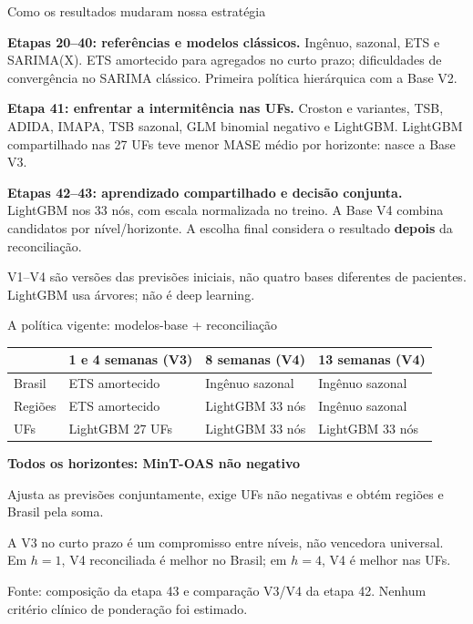 \documentclass[10pt,aspectratio=169]{beamer}
\newcommand{\nota}[1]{{\color{pucgray}\scriptsize #1}}
\begin{document}
\begin{frame}{Como os resultados mudaram nossa estratégia}
  \footnotesize
  \begin{cartao}\textbf{Etapas 20--40: referências e modelos clássicos.}
  Ingênuo, sazonal, ETS e SARIMA(X). ETS amortecido para agregados no curto prazo; dificuldades de convergência no SARIMA clássico. Primeira política hierárquica com a Base V2.\end{cartao}
  \begin{cartao}\textbf{Etapa 41: enfrentar a intermitência nas UFs.}
  Croston e variantes, TSB, ADIDA, IMAPA, TSB sazonal, GLM binomial negativo e LightGBM. LightGBM compartilhado nas 27 UFs teve menor MASE médio por horizonte: nasce a Base V3.\end{cartao}
  \begin{cartao}\textbf{Etapas 42--43: aprendizado compartilhado e decisão conjunta.}
  LightGBM nos 33 nós, com escala normalizada no treino. A Base V4 combina candidatos por nível/horizonte. A escolha final considera o resultado \textbf{depois} da reconciliação.\end{cartao}
  \nota{V1--V4 são versões das previsões iniciais, não quatro bases diferentes de pacientes. LightGBM usa árvores; não é deep learning.}
\end{frame}

\begin{frame}{A política vigente: modelos-base + reconciliação}
  \small\centering
  \renewcommand{\arraystretch}{1.5}
  \begin{tabular}{llll}
    \toprule
    & \textbf{1 e 4 semanas (V3)} & \textbf{8 semanas (V4)} & \textbf{13 semanas (V4)}\\
    \midrule
    Brasil & ETS amortecido & Ingênuo sazonal & Ingênuo sazonal\\
    Regiões & ETS amortecido & LightGBM 33 nós & Ingênuo sazonal\\
    UFs & LightGBM 27 UFs & LightGBM 33 nós & LightGBM 33 nós\\
    \bottomrule
  \end{tabular}
  \vspace{12pt}
  \begin{mensagem}\centering\textbf{Todos os horizontes: MinT-OAS não negativo}\par
  \small Ajusta as previsões conjuntamente, exige UFs não negativas e obtém regiões e Brasil pela soma.\end{mensagem}
  \raggedright\small
  A V3 no curto prazo é um compromisso entre níveis, não vencedora universal. Em $h=1$, V4 reconciliada é melhor no Brasil; em $h=4$, V4 é melhor nas UFs.
  \vspace{4pt}\par\nota{Fonte: composição da etapa 43 e comparação V3/V4 da etapa 42. Nenhum critério clínico de ponderação foi estimado.}
\end{frame}
\end{document}
